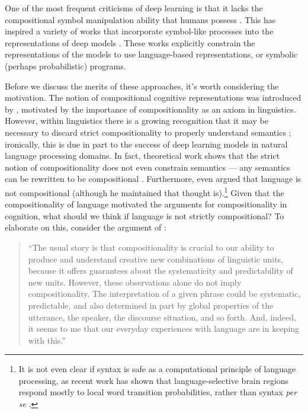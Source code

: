 One of the most frequent criticisms of deep learning is that it lacks the compositional symbol manipulation ability that humans possess \citep[][see also above]{Fodor1988, Lake2016,Lake2017,Marcus2018}. This has inspired a variety of works that incorporate symbol-like processes into the representations of deep models \citep[e.g.][]{Andreas2017,Mao2019}. These works explicitly constrain the representations of the models to use language-based representations, or symbolic (perhaps probabilistic) programs. \par 
Before we discuss the merits of these approaches, it's worth considering the motivation. The notion of compositional cognitive representations was introduced by \citet{Fodor1988}, motivated by the importance of compositionality as an axiom in linguistics. However, within linguistics there is a growing recognition that it may be necessary to discard strict compositionality to properly understand semantics \citep{Goldberg2015,Potts2019}; ironically, this is due in part to the success of deep learning models in natural language processing domains. In fact, theoretical work shows that the strict notion of compositionality does not even constrain semantics --- any semantics can be rewritten to be compositional \citep{Zadrozny1992}. Furthermore, even \citet{Fodor2001} argued that language is not compositional (although he maintained that thought is).\footnote{It is not even clear if syntax is safe as a computational principle of language processing, as recent work has shown that language-selective brain regions respond mostly to local word transition probabilities, rather than syntax \emph{per se} \citep{Mollica2020}.} Given that the compositionality of language motivated the arguments for compositionality in cognition, what should we think if language is not strictly compositional? To elaborate on this, consider the argument of \citet{Potts2019}:
\begin{quote}
``The usual story is that compositionality is crucial to our ability to produce and understand creative new combinations of linguistic units, because it offers guarantees about the systematicity and predictability of new units. However, these observations alone do not imply compositionality. The interpretation of a given phrase could be systematic, predictable, and also determined in part by global properties of the utterance, the speaker, the discourse situation, and so forth. And, indeed, it seems to me that our everyday experiences with language are in keeping with this.''
\end{quote}
